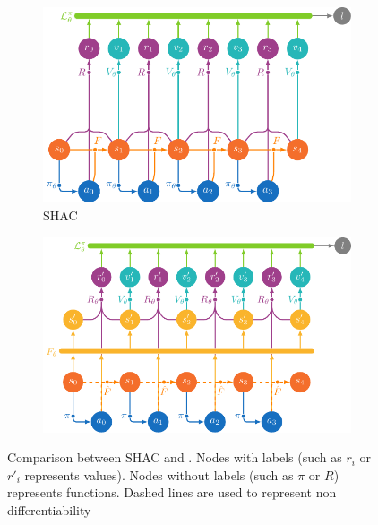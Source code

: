 \begin{figure}[t]
    \centering
    \begin{subfigure}[b]{0.45\textwidth}
        \includegraphics[width=\textwidth]{figs/shac.pdf}
        \caption{SHAC}
        \label{fig:shac}
    \end{subfigure}
    \begin{subfigure}[b]{0.45\textwidth}
        \includegraphics[width=\textwidth]{figs/shacpp.pdf}
        \caption{\fname{}}
        \label{fig:shacpp}
    \end{subfigure}
    \caption{Comparison between SHAC and \fname{}. Nodes with labels (such as $r_i$ or $r'_i$ represents values). Nodes without labels (such as $\pi$ or $R$) represents functions. Dashed lines are used to represent non differentiability}\label{fig:shac-shacpp}
\end{figure}

